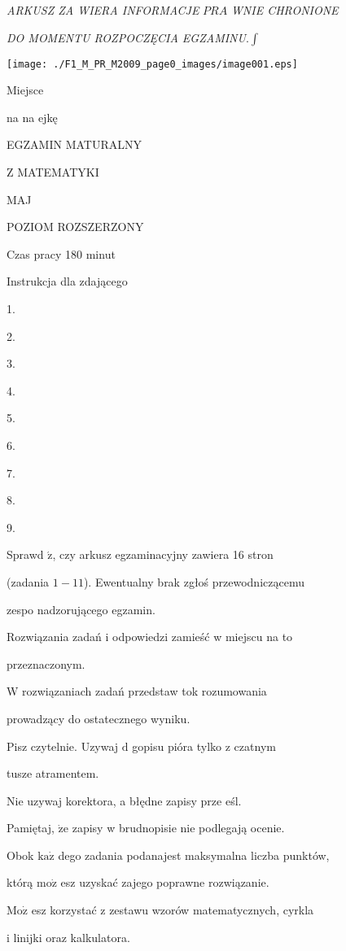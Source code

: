 \documentclass[a4paper,12pt]{article}
\begin{document}
{\it ARKUSZ ZA WIERA INFORMACJE} $PRA$ {\it WNIE CHRONIONE}

{\it DO MOMENTU ROZPOCZĘCIA EGZAMINU}.$\displaystyle \int$
\begin{center}
\texttt{[image: ./F1\_M\_PR\_M2009\_page0\_images/image001.eps]}
\end{center}
Miejsce

na na ejkę

EGZAMIN MATURALNY

Z MATEMATYKI

MAJ

POZIOM ROZSZERZONY

Czas pracy 180 minut

Instrukcja dla zdającego

1.

2.

3.

4.

5.

6.

7.

8.

9.

Sprawd $\acute{\mathrm{z}}$, czy arkusz egzaminacyjny zawiera 16 stron

(zadania $1-11$). Ewentualny brak zgłoś przewodniczącemu

zespo nadzorującego egzamin.

Rozwiązania zadań i odpowiedzi zamieść w miejscu na to

przeznaczonym.

W rozwiązaniach zadań przedstaw tok rozumowania

prowadzący do ostatecznego wyniku.

Pisz czytelnie. Uzywaj $\mathrm{d}$ gopisu pióra tylko z czatnym

tusze atramentem.

Nie uzywaj korektora, a błędne zapisy prze eśl.

Pamiętaj, $\dot{\mathrm{z}}\mathrm{e}$ zapisy w brudnopisie nie podlegają ocenie.

Obok $\mathrm{k}\mathrm{a}\dot{\mathrm{z}}$ dego zadania podanajest maksymalna liczba punktów,

którą $\mathrm{m}\mathrm{o}\dot{\mathrm{z}}$ esz uzyskać zajego poprawne rozwiązanie.

$\mathrm{M}\mathrm{o}\dot{\mathrm{z}}$ esz korzystać z zestawu wzorów matematycznych, cyrkla

i linijki oraz kalkulatora.
\end{document}
